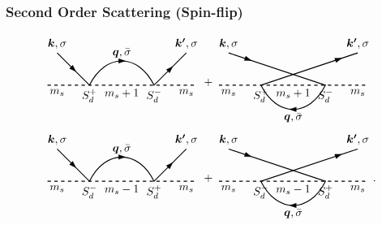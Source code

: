 \documentclass[10pt,aspectratio=43,xcolor=x11names]{beamer}%
\begin{document}
		\begin{frame}\frametitle{Second Order Scattering (Spin-flip)}
			\begin{align*}
				&\begin{tikzpicture}[baseline]
					\draw[thick,dashed] (-2.3,0)--(2.3,0);
					\draw[thick] (-2,1)--(-1,0) .. controls (-0.5,1) and (0.5,1) ..(1,0)--(2,1);
					\node[below] at (-2,0) {$m_s$};
					\node[below] at (0,0) {$m_s+1$};
					\node[below] at (2,0) {$m_s$};
					\node[below] at (1,0) {$S_d^-$};
					\node[below] at (-1,0) {$S_d^+$};
					\node[rotate=-45] at (-1.5,0.5) {\arrow};
					\node at (0,0.75) {\arrow};
					\node at (0,1) {$\bm{q},\bar{\sigma}$};
					\node[above] at (-2,1) {$\bm{k},\sigma$};
					\node[above] at (2,1) {$\bm{k'},\sigma$};
					\node[rotate=45] at (1.5,0.5) {\arrow};
				\end{tikzpicture}+\begin{tikzpicture}[baseline]
					\draw[thick,dashed] (-2.3,0)--(2.3,0);
					\draw[thick] (-2,1)--(1,0) .. controls (0.5,-1) and (-0.5,-1) .. (-1,0)--(2,1);
					\node[below] at (-2,0) {$m_s$};
					\node[below] at (0,0) {$m_s+1$};
					\node[below] at (2,0) {$m_s$};
					\node[below] at (1,0) {$S_d^-$};
					\node[below] at (-1,0) {$S_d^+$};
					\node[rotate=-20] at (-1.4,0.8) {\arrow};
					\node[rotate=180] at (0,-0.75) {\arrow};
					\node at (0,-1) {$\bm{q},\bar\sigma$};
					\node[above] at (-2,1) {$\bm{k},\sigma$};
					\node[above] at (2,1) {$\bm{k'},\sigma$};
					\node[rotate=20] at (1.4,0.8) {\arrow};
				\end{tikzpicture}\\
				&\begin{tikzpicture}[baseline]
					\draw[thick,dashed] (-2.3,0)--(2.3,0);
					\draw[thick] (-2,1)--(-1,0) .. controls (-0.5,1) and (0.5,1) ..(1,0)--(2,1);
					\node[below] at (-2,0) {$m_s$};
					\node[below] at (0,0) {$m_s-1$};
					\node[below] at (2,0) {$m_s$};
					\node[below] at (1,0) {$S_d^+$};
					\node[below] at (-1,0) {$S_d^-$};
					\node[rotate=-45] at (-1.5,0.5) {\arrow};
					\node at (0,0.75) {\arrow};
					\node at (0,1) {$\bm{q},\bar{\sigma}$};
					\node[above] at (-2,1) {$\bm{k},\sigma$};
					\node[above] at (2,1) {$\bm{k'},\sigma$};
					\node[rotate=45] at (1.5,0.5) {\arrow};
				\end{tikzpicture}+
				\begin{tikzpicture}[baseline]
					\draw[thick,dashed] (-2.3,0)--(2.3,0);
					\draw[thick] (-2,1)--(1,0) .. controls (0.5,-1) and (-0.5,-1) .. (-1,0)--(2,1);
					\node[below] at (-2,0) {$m_s$};
					\node[below] at (0,0) {$m_s-1$};
					\node[below] at (2,0) {$m_s$};
					\node[below] at (1,0) {$S_d^+$};
					\node[below] at (-1,0) {$S_d^-$};
					\node[rotate=-20] at (-1.4,0.8) {\arrow};
					\node[rotate=180] at (0,-0.75) {\arrow};
					\node at (0,-1) {$\bm{q},\bar\sigma$};
					\node[above] at (-2,1) {$\bm{k},\sigma$};
					\node[above] at (2,1) {$\bm{k'},\sigma$};
					\node[rotate=20] at (1.4,0.8) {\arrow};
				\end{tikzpicture}.
			\end{align*}
		\end{frame}
\end{document}
